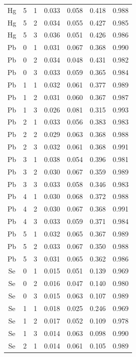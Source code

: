\documentclass[ms, hidelinks]{uncgdissertationexp3}
\theoremstyle{plain}
\theoremstyle{definition}
\theoremstyle{remark}
\begin{document}
\begin{longtable}{ccccccc}
  Hg & 5 & 1 & 0.033 & 0.058 & 0.418 & 0.988\\
  \rowcolor{gray!6}  Hg & 5 & 2 & 0.034 & 0.055 & 0.427 & 0.985\\
  Hg & 5 & 3 & 0.036 & 0.051 & 0.426 & 0.986\\
  \rowcolor{gray!6}  Pb & 0 & 1 & 0.031 & 0.067 & 0.368 & 0.990\\
  Pb & 0 & 2 & 0.034 & 0.048 & 0.431 & 0.982\\
  \rowcolor{gray!6}  Pb & 0 & 3 & 0.033 & 0.059 & 0.365 & 0.984\\
  Pb & 1 & 1 & 0.032 & 0.061 & 0.377 & 0.989\\
  \rowcolor{gray!6}  Pb & 1 & 2 & 0.031 & 0.060 & 0.367 & 0.987\\
  Pb & 1 & 3 & 0.026 & 0.081 & 0.315 & 0.993\\
  \rowcolor{gray!6}  Pb & 2 & 1 & 0.033 & 0.056 & 0.383 & 0.983\\
  Pb & 2 & 2 & 0.029 & 0.063 & 0.368 & 0.988\\
  \rowcolor{gray!6}  Pb & 2 & 3 & 0.032 & 0.061 & 0.368 & 0.991\\
  Pb & 3 & 1 & 0.038 & 0.054 & 0.396 & 0.981\\
  \rowcolor{gray!6}  Pb & 3 & 2 & 0.030 & 0.067 & 0.359 & 0.989\\
  Pb & 3 & 3 & 0.033 & 0.058 & 0.346 & 0.983\\
  \rowcolor{gray!6}  Pb & 4 & 1 & 0.030 & 0.068 & 0.372 & 0.988\\
  Pb & 4 & 2 & 0.030 & 0.067 & 0.368 & 0.991\\
  \rowcolor{gray!6}  Pb & 4 & 3 & 0.033 & 0.059 & 0.371 & 0.984\\
  Pb & 5 & 1 & 0.032 & 0.065 & 0.367 & 0.989\\
  \rowcolor{gray!6}  Pb & 5 & 2 & 0.033 & 0.067 & 0.350 & 0.988\\
  Pb & 5 & 3 & 0.031 & 0.065 & 0.362 & 0.986\\
  \rowcolor{gray!6}  Se & 0 & 1 & 0.015 & 0.051 & 0.139 & 0.969\\
  Se & 0 & 2 & 0.016 & 0.047 & 0.140 & 0.980\\
  \rowcolor{gray!6}  Se & 0 & 3 & 0.015 & 0.063 & 0.107 & 0.989\\
  Se & 1 & 1 & 0.018 & 0.025 & 0.246 & 0.969\\
  \rowcolor{gray!6}  Se & 1 & 2 & 0.017 & 0.052 & 0.109 & 0.978\\
  Se & 1 & 3 & 0.014 & 0.063 & 0.098 & 0.990\\
  \rowcolor{gray!6}  Se & 2 & 1 & 0.014 & 0.061 & 0.105 & 0.989\\

\end{longtable}
\end{document}

